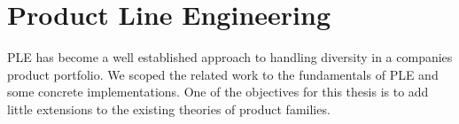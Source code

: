 %


















\section{Product Line Engineering}

\ac{PLE} has become a well established approach to handling diversity in a companies product portfolio. We scoped the related work to the fundamentals of \ac{PLE} and some concrete implementations. One of the objectives for this thesis is to add little extensions to the existing theories of product families.

